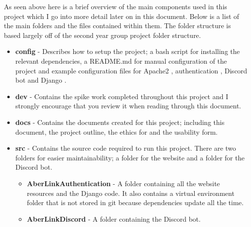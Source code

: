 As seen above here is a brief overview of the main components used in this project which I go into more detail later on in this document. Below is a list of the main folders and the files contained within them. The folder structure is based largely off of the second year group project folder structure.

\begin{itemize}
	\item \textbf{config} - Describes how to setup the project; a bash script for installing the relevant dependencies, a README.md for manual configuration of the project and example configuration files for Apache2 \cite{apache2}, authentication \cite{libapache2-mod-auth-openidc}, Discord bot and Django \cite{Django}.
	\item \textbf{dev} - Contains the spike work completed throughout this project and I strongly encourage that you review it when reading through this document.
	\item \textbf{docs} - Contains the documents created for this project; including this document, the project outline, the ethics for and the usability form.
	\item \textbf{src} - Contains the source code required to run this project. There are two folders for easier maintainability; a folder for the website and a folder for the Discord bot.
	\begin{itemize}
		\item \textbf{AberLinkAuthentication} - A folder containing all the website resources and the Django \cite{Django} code. It also contains a virtual environment \cite{pipenv} folder that is not stored in git because dependencies update all the time.
		\item \textbf{AberLinkDiscord} - A folder containing the Discord bot. 
	\end{itemize}
\end{itemize}



